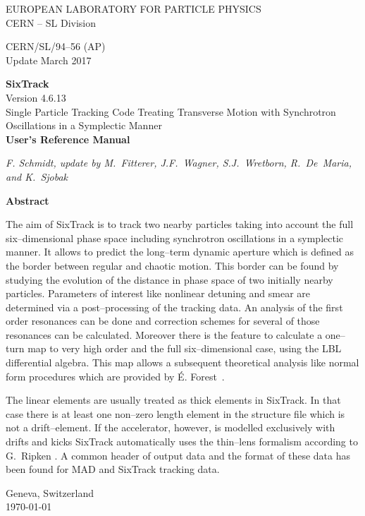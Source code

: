 \documentclass[a4paper,11pt]{report}
\begin{document}

\begin{titlepage}
\begin{center}\normalsize
  EUROPEAN LABORATORY FOR PARTICLE PHYSICS \\
  CERN -- SL Division
\end{center}
\vspace*{2mm}
\begin{flushright}
  CERN/SL/94--56  (AP) \\
  Update March 2017
\end{flushright}
\begin{center}\LARGE
  {\bf SixTrack} \\
  Version 4.6.13 \\
  {Single Particle Tracking Code Treating Transverse Motion with Synchrotron Oscillations in a Symplectic Manner} \\
  \vspace*{2mm} {\bf User's Reference Manual}
\end{center}
\begin{center}\em
  F. Schmidt, update by M.~Fitterer, J.F.~Wagner, S.J.~Wretborn, R.~De~Maria, and K.~Sjobak
\end{center}
\begin{center}\large
  {\bf Abstract} \\
\end{center}
The aim of SixTrack is to track two nearby particles taking into
account the full six--dimensional phase space including synchrotron
oscillations in a symplectic manner. It allows to predict the
long--term dynamic aperture which is defined as the border between
regular and chaotic motion. This border can be found by studying the
evolution of the distance in phase space of two initially nearby
particles.  Parameters of interest like nonlinear detuning and smear
are determined via a post--processing of the tracking data.  An
analysis of the first order resonances can be done and correction
schemes for several of those resonances can be calculated.  Moreover
there is the feature to calculate a one--turn map to very high order
and the full six--dimensional case, using the LBL differential
algebra. This map allows a subsequent theoretical 
analysis like normal form procedures which are provided by \'{E}.
Forest~\cite{DALIE}.

The linear elements are usually treated as thick elements in
SixTrack\@.  In that case there is at least one non--zero length
element in the structure file which is not a drift--element.  If the
accelerator, however, is modelled exclusively with drifts and kicks
SixTrack automatically uses the thin--lens formalism according to
G.~Ripken \cite{Ripken95}. A common header of output
data and the format of these data has been found for MAD and SixTrack
tracking data.

\vfill
\begin{center}
  Geneva, Switzerland \\
  \today
\end{center}

\end{titlepage}
\end{document}
